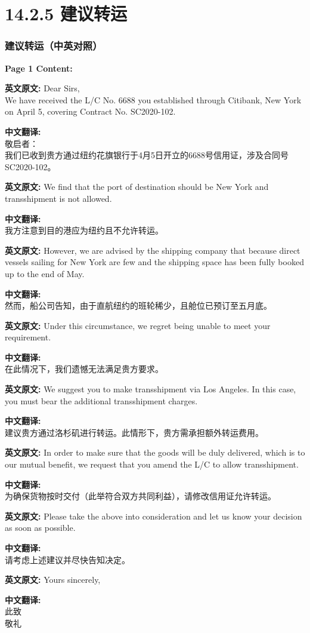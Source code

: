 \documentclass[12pt]{beamer}
\begin{document}
    \section{14.2.5 建议转运}
\begin{frame}[allowframebreaks]
\frametitle{建议转运（中英对照）}
\textbf{Page 1 Content:}

\medskip
\textbf{英文原文:}
Dear Sirs,\\
We have received the L/C No. 6688 you established through Citibank, New York on April 5, covering Contract No. SC2020-102. 

\smallskip
\textbf{中文翻译:}\\
敬启者：\\
我们已收到贵方通过纽约花旗银行于4月5日开立的6688号信用证，涉及合同号SC2020-102。

\medskip
\textbf{英文原文:}
We find that the port of destination should be New York and transshipment is not allowed.

\smallskip
\textbf{中文翻译:}\\
我方注意到目的港应为纽约且不允许转运。

\medskip
\textbf{英文原文:}
However, we are advised by the shipping company that because direct vessels sailing for New York are few and the shipping space has been fully booked up to the end of May.

\smallskip
\textbf{中文翻译:}\\
然而，船公司告知，由于直航纽约的班轮稀少，且舱位已预订至五月底。

\medskip
\textbf{英文原文:}
Under this circumstance, we regret being unable to meet your requirement.

\smallskip
\textbf{中文翻译:}\\
在此情况下，我们遗憾无法满足贵方要求。

\medskip
\textbf{英文原文:}
We suggest you to make transshipment via Los Angeles. In this case, you must bear the additional transshipment charges.

\smallskip
\textbf{中文翻译:}\\
建议贵方通过洛杉矶进行转运。此情形下，贵方需承担额外转运费用。

\framebreak

\textbf{英文原文:}
In order to make sure that the goods will be duly delivered, which is to our mutual benefit, we request that you amend the L/C to allow transshipment.

\smallskip
\textbf{中文翻译:}\\
为确保货物按时交付（此举符合双方共同利益），请修改信用证允许转运。

\medskip
\textbf{英文原文:}
Please take the above into consideration and let us know your decision as soon as possible.

\smallskip
\textbf{中文翻译:}\\
请考虑上述建议并尽快告知决定。

\medskip
\textbf{英文原文:}
Yours sincerely,

\smallskip
\textbf{中文翻译:}\\
此致\\
敬礼
\end{frame}
\end{document}
